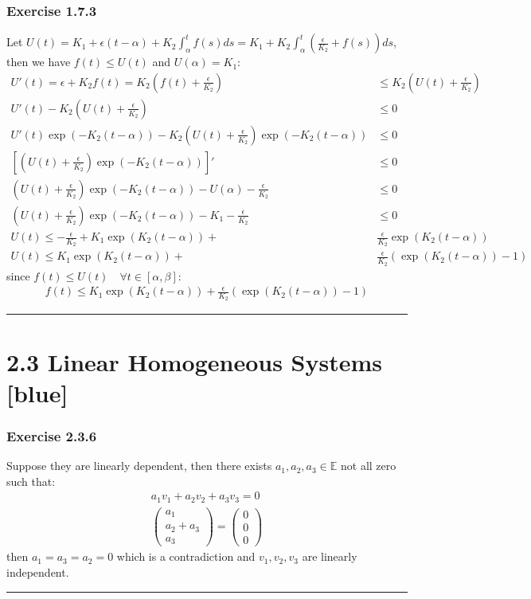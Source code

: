 \documentclass[12pt, letterpaper]{scrartcl}
\begin{document}
\subsubsection*{Exercise 1.7.3}
Let $U(t)=K_1+\epsilon(t-\alpha)+K_2\int_{\alpha}^{t}f(s)ds=K_1+K_2\int_{\alpha}^{t}(\frac{\epsilon}{K_2}+f(s))ds$, then we have $f(t)\leq U(t)$ and $U(\alpha)=K_1$:
\begin{align*}
    U'(t)=\epsilon+K_2f(t)=K_2(f(t)+\frac{\epsilon}{K_2})&\leq K_2(U(t)+\frac{\epsilon}{K_2})\\
    U'(t)-K_2(U(t)+\frac{\epsilon}{K_2})&\leq0\\
    U'(t)\exp(-K_2(t-\alpha))-K_2(U(t)+\frac{\epsilon}{K_2})\exp(-K_2(t-\alpha))&\leq0\\
    [(U(t)+\frac{\epsilon}{K_2})\exp(-K_2(t-\alpha))]'&\leq0\\
    (U(t)+\frac{\epsilon}{K_2})\exp(-K_2(t-\alpha))-U(\alpha)-\frac{\epsilon}{K_2}&\leq0\\
    (U(t)+\frac{\epsilon}{K_2})\exp(-K_2(t-\alpha))-K_1-\frac{\epsilon}{K_2}&\leq0\\
    U(t)\leq-\frac{\epsilon}{K_2}+K_1\exp(K_2(t-\alpha))+&\frac{\epsilon}{K_2}\exp(K_2(t-\alpha))\\
    U(t)\leq K_1\exp(K_2(t-\alpha))+&\frac{\epsilon}{K_2}(\exp(K_2(t-\alpha))-1)
\end{align*}
since $f(t)\leq U(t) \quad\forall t\in[\alpha, \beta]$:
\begin{align*}
    f(t)\leq K_1\exp(K_2(t-\alpha))+\frac{\epsilon}{K_2}(\exp(K_2(t-\alpha))-1)
\end{align*}
\vskip1mm\hrule
\clearpage

\section*{2.3 Linear Homogeneous Systems \xrfill[2pt]{3pt}[blue]}

\subsubsection*{Exercise 2.3.6}
Suppose they are linearly dependent, then there exists $a_1, a_2, a_3\in \mathbb{E}$ not all zero such that:
\begin{align*}
    a_1v_1+a_2v_2+a_3v_3=0\\
    \left( \begin{array}{c} a_1 \\ a_2+a_3 \\ a_3 \end{array} \right)=\left( \begin{array}{c} 0 \\ 0 \\ 0 \end{array} \right) 
\end{align*}
then $a_1=a_3=a_2=0$ which is a contradiction and $v_1, v_2, v_3$ are linearly independent.
\vskip1mm\hrule
\end{document}
